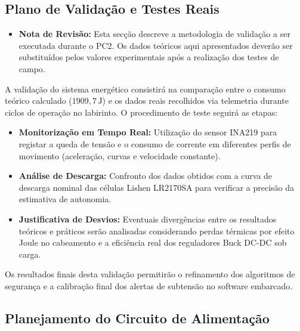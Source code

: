 \subsection{Plano de Validação e Testes Reais}

\begin{itemize}
    \item \textbf{Nota de Revisão:} Esta secção descreve a metodologia de validação a ser executada durante o PC2. Os dados teóricos aqui apresentados deverão ser substituídos pelos valores experimentais após a realização dos testes de campo.
\end{itemize}

A validação do sistema energético consistirá na comparação entre o consumo teórico calculado ($1909,7\,\mathrm{J}$) e os dados reais recolhidos via telemetria durante ciclos de operação no labirinto. O procedimento de teste seguirá as etapas:

\begin{itemize}
    \item \textbf{Monitorização em Tempo Real:} Utilização do sensor INA219 para registar a queda de tensão e o consumo de corrente em diferentes perfis de movimento (aceleração, curvas e velocidade constante).
    \item \textbf{Análise de Descarga:} Confronto dos dados obtidos com a curva de descarga nominal das células Lishen LR2170SA para verificar a precisão da estimativa de autonomia.
    \item \textbf{Justificativa de Desvios:} Eventuais divergências entre os resultados teóricos e práticos serão analisadas considerando perdas térmicas por efeito Joule no cabeamento e a eficiência real dos reguladores Buck DC-DC sob carga.
\end{itemize}

Os resultados finais desta validação permitirão o refinamento dos algoritmos de segurança e a calibração final dos alertas de subtensão no software embarcado.

\subsection{Planejamento do Circuito de Alimentação}

